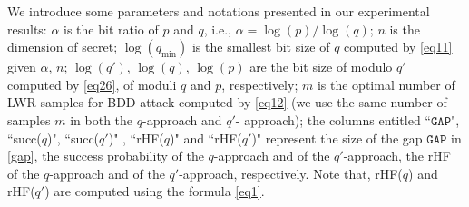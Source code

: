 \documentclass[runningheads]{llncs}
\begin{document}
We introduce some parameters and notations presented in our experimental results: $\alpha$ is the bit ratio of $p$ and $q$, i.e., $\alpha=\log (p)/ \log (q)$; $n$ is the dimension of secret; $\log (q_{\text{min}})$ is the smallest bit size of $q$ computed by \eqref{eq11} given $\alpha$, $n$; $\log (q')$, $\log (q)$, $\log(p)$ are the bit size of modulo $q'$ computed by \eqref{eq26}, of moduli $q$ and $p$, respectively; $m$ is the optimal number of LWR samples for BDD attack computed by \eqref{eq12} (we use the same number of samples $m$ in both the $q$-approach and $q'$- approach); the columns entitled ``$\mathtt{GAP}$", ``succ($q$)", ``succ($q'$)" ,  ``rHF($q$)" and ``rHF($q'$)" represent the size of the gap $\mathtt{GAP}$ in \eqref{gap}, the success probability of the $q$-approach and of the $q'$-approach, the rHF of the $q$-approach and of the $q'$-approach, respectively. Note that, rHF($q$) and rHF($q'$) are computed using the formula \eqref{eq1}.
\end{document}
